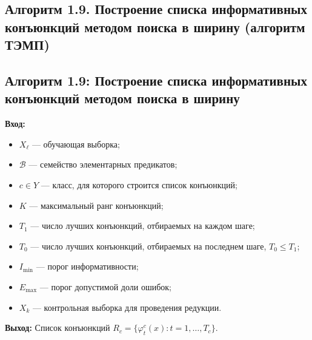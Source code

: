 \subsection{Алгоритм 1.9. Построение списка информативных конъюнкций методом поиска в ширину (алгоритм ТЭМП)}


\subsection{Алгоритм 1.9: Построение списка информативных конъюнкций методом поиска в ширину}

\textbf{Вход:}
\begin{itemize}
    \item $X_\ell$ --- обучающая выборка;
    \item $\mathcal{B}$ --- семейство элементарных предикатов;
    \item $c \in Y$ --- класс, для которого строится список конъюнкций;
    \item $K$ --- максимальный ранг конъюнкций;
    \item $T_1$ --- число лучших конъюнкций, отбираемых на каждом шаге;
    \item $T_0$ --- число лучших конъюнкций, отбираемых на последнем шаге, $T_0 \leq T_1$;
    \item $I_{\min}$ --- порог информативности;
    \item $E_{\max}$ --- порог допустимой доли ошибок;
    \item $X_k$ --- контрольная выборка для проведения редукции.
\end{itemize}

\textbf{Выход:} Список конъюнкций $R_c = \{\varphi_t^c(x) : t = 1, \dots, T_c\}$.

